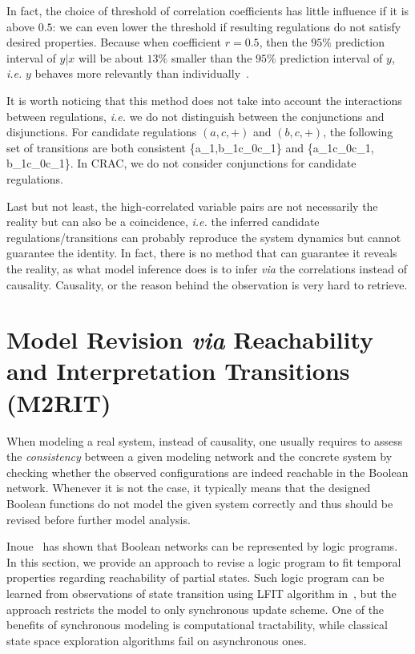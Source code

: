 In fact, the choice of threshold of correlation coefficients has little influence if it is above $0.5$: we can even lower the threshold if resulting regulations do not satisfy desired properties.
Because when coefficient $r =0.5$, then the $95\%$ prediction interval of $y|x$ will be about $13\%$ smaller than the $95\%$ prediction interval of $y$, \textit{i.e.} $y$ behaves more relevantly than individually~\cite{hull1927correlation}.

It is worth noticing that this method does not take into account the interactions between regulations, \textit{i.e.} we do not distinguish between the conjunctions and disjunctions.
For candidate regulations $(a,c,+)$ and $(b,c,+)$, the following set of transitions are both consistent \{\ac{a_1,b_1}{c_0}{c_1}\} and \{\ac{a_1}{c_0}{c_1}, \ac{b_1}{c_0}{c_1}\}.
In CRAC, we do not consider conjunctions for candidate regulations.

Last but not least, the high-correlated variable pairs are not necessarily the reality but can also be a coincidence, \textit{i.e.} the inferred candidate regulations/transitions can probably reproduce the system dynamics but cannot guarantee the identity.
In fact, there is no method that can guarantee it reveals the reality, as what model inference does is to infer \textit{via} the correlations instead of causality.
Causality, or the reason behind the observation is very hard to retrieve.

\section{Model Revision \textit{via} Reachability and Interpretation Transitions (M2RIT)}\label{sec:m2rit}
When modeling a real system, instead of causality, one usually requires to assess the \textit{consistency} between a given modeling network and the concrete system by checking whether the observed configurations are indeed reachable in the Boolean network.
Whenever it is not the case, it typically means that the designed Boolean functions do not model the given system correctly and thus should be revised before further model analysis.

Inoue~\cite{inoue2011logic} has shown that Boolean networks can be represented by logic programs.
In this section, we provide an approach to revise a logic program to fit temporal properties regarding reachability of partial states.
%
Such logic program can be learned from observations of state transition using LFIT algorithm in~\cite{ribeiro2015learning}, but the approach restricts the model to only synchronous update scheme.
One of the benefits of synchronous modeling is computational tractability, while classical state space exploration algorithms fail on asynchronous ones.

